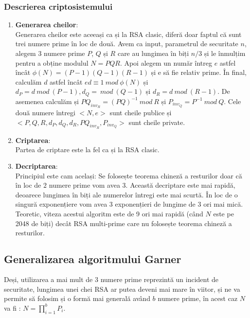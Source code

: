\documentclass[12]{report}
\begin{document}
		 \subsubsection{Descrierea criptosistemului}
		 \begin{enumerate}
		  \item \textbf{Generarea cheilor}: \\
		  Generarea cheilor este aceeași ca și la RSA clasic, diferă doar faptul că sunt trei numere prime în loc de două. Avem ca input, parametrul de securitate $n$, alegem 3 numere prime $P$, $Q$ și $R$ care au lungimea în biți $n/3$ și le înmulțim pentru a obține modulul $N=PQR$. Apoi alegem un număr întreg $e$ astfel încât $\phi(N)=(P-1)(Q-1)(R-1)$ și e să fie relativ prime. În final, calculăm $d$ astfel încât $ed \equiv 1 \ mod \ \phi(N)$ și $d_P=d \ mod \ (P-1), d_Q= \ mod \ (Q-1)$ și $d_R=d \ mod \ (R-1)$. De asemenea calculăm și $PQ_{inv_R}=(PQ)^{-1} \ mod \ R$ și $P_{inv_Q}=P^{-1} \ mod \ Q$. Cele două numere întregi $<N,e>$ sunt cheile publice și $<P,Q,R,d_P,d_Q,d_R,PQ_{inv_R},P_{inv_Q}>$ sunt cheile private.
		  
		  \item \textbf{Criptarea}: \\
		  Partea de criptare este la fel ca și la RSA clasic.
		  
		  \item \textbf{Decriptarea}: \\
		  Principiul este cam același: Se folosește teorema chineză a resturilor doar că în loc de $2$ numere prime vom avea $3$. Această decriptare este mai rapidă, deoarece lungimea în biți ale numerelor întregi este mai scurtă. În loc de o singură exponențiere vom avea 3 exponențieri de lungime de 3 ori mai mică. Teoretic, viteza acestui algoritm este de 9 ori mai rapidă (când $N$ este pe 2048 de biți) decât RSA multi-prime care nu folosește teorema chineză a resturilor.
		  
		 \end{enumerate}
		 
		 \subsection{Generalizarea algoritmului Garner}
		 Deși, utilizarea a mai mult de $3$ numere prime reprezintă un incident de securitate, lungimea unei chei RSA ar putea deveni mai mare în viitor, și ne va permite să folosim și o formă mai generală având $b$ numere prime, în acest caz $N$ va fi : $N=\prod_{i=1}^{b} P_i$.
\end{document}
